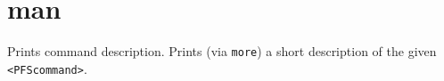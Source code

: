 \section{man}
\begin{man}
  \PP Prints command description.
  \DE Prints (via {\tt more}) a short description of the given {\tt <PFScommand>}.
\end{man}
